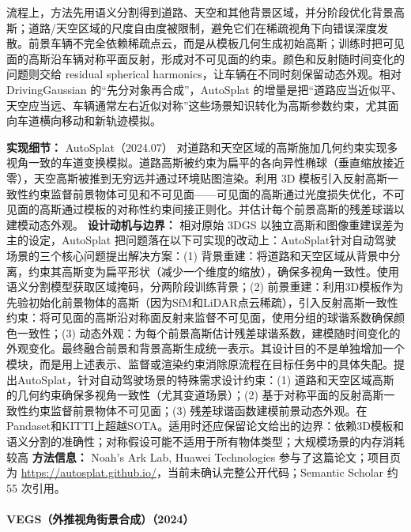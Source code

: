 流程上，方法先用语义分割得到道路、天空和其他背景区域，并分阶段优化背景高斯；道路/天空区域的尺度自由度被限制，避免它们在稀疏视角下向错误深度发散。前景车辆不完全依赖稀疏点云，而是从模板几何生成初始高斯；训练时把可见面的高斯沿车辆对称平面反射，形成对不可见面的约束。颜色和反射随时间变化的问题则交给 residual spherical harmonics，让车辆在不同时刻保留动态外观。相对 DrivingGaussian 的“先分对象再合成”，AutoSplat 的增量是把“道路应当近似平、天空应当远、车辆通常左右近似对称”这些场景知识转化为高斯参数约束，尤其面向车道横向移动和新轨迹模拟。

\textbf{实现细节：} AutoSplat（2024.07） 对道路和天空区域的高斯施加几何约束实现多视角一致的车道变换模拟。道路高斯被约束为扁平的各向异性椭球（垂直缩放接近零），天空高斯被推到无穷远并通过环境贴图渲染。利用 3D 模板引入反射高斯一致性约束监督前景物体可见和不可见面——可见面的高斯通过光度损失优化，不可见面的高斯通过模板的对称性约束间接正则化。并估计每个前景高斯的残差球谐以建模动态外观。
\textbf{设计动机与边界：} 相对原始 3DGS 以独立高斯和图像重建误差为主的设定，AutoSplat 把问题落在以下可实现的改动上：AutoSplat针对自动驾驶场景的三个核心问题提出解决方案：(1) 背景重建：将道路和天空区域从背景中分离，约束其高斯变为扁平形状（减少一个维度的缩放），确保多视角一致性。使用语义分割模型获取区域掩码，分两阶段训练背景；(2) 前景重建：利用3D模板作为先验初始化前景物体的高斯（因为SfM和LiDAR点云稀疏），引入反射高斯一致性约束：将可见面的高斯沿对称面反射来监督不可见面，使用分组的球谐系数确保颜色一致性；(3) 动态外观：为每个前景高斯估计残差球谐系数，建模随时间变化的外观变化。最终融合前景和背景高斯生成统一表示。其设计目的不是单独增加一个模块，而是用上述表示、监督或渲染约束消除原流程在目标任务中的具体失配。提出AutoSplat，针对自动驾驶场景的特殊需求设计约束：(1) 道路和天空区域高斯的几何约束确保多视角一致性（尤其变道场景）；(2) 基于对称平面的反射高斯一致性约束监督前景物体不可见面；(3) 残差球谐函数建模前景动态外观。在Pandaset和KITTI上超越SOTA。适用时还应保留论文给出的边界：依赖3D模板和语义分割的准确性；对称假设可能不适用于所有物体类型；大规模场景的内存消耗较高
\textbf{方法信息：} Noah's Ark Lab, Huawei Technologies 参与了这篇论文；项目页为 \url{https://autosplat.github.io/}，当前未确认完整公开代码；Semantic Scholar 约 55 次引用。



\paragraph{VEGS（外推视角街景合成）（2024）}

